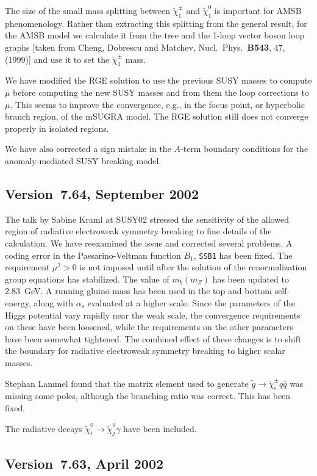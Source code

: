 The size of the small mass splitting between $\tilde\chi_1^\pm$ and
$\tilde\chi_1^0$ is important for AMSB phenomenology. Rather than
extracting this splitting from the general result, for the AMSB model we
calculate it from the tree and the 1-loop vector boson loop graphs
[taken from Cheng, Dobrescu and Matchev, Nucl.\ Phys.\ {\bf B543}, 47,
(1999)] and use it to set the $\tilde\chi_1^\pm$ mass.

We have modified the RGE solution to use the previous SUSY masses to
compute $\mu$ before computing the new SUSY masses and from them the
loop corrections to $\mu$. This seems to improve the convergence, e.g.,
in the focus point, or hyperbolic branch region, of the mSUGRA model. 
The RGE solution still does not converge properly in isolated regions.

We have also corrected a sign mistake in the $A$-term boundary
conditions for the anomaly-mediated SUSY breaking model.

\subsection{Version~7.64, September 2002}

     The talk by Sabine Kraml at SUSY02 stressed the sensitivity of the
allowed region of radiative electroweak symmetry breaking to fine
details of the calculation. We have reexamined the issue and corrected
several problems. A coding error in the Passarino-Veltman function $B_1$,
\verb|SSB1| has been fixed. The requirement $\mu^2>0$ is not imposed
until after the solution of the renormalization group equations has
stabilized. The value of $m_b(m_Z)$ has been updated to 2.83~GeV. A
running gluino mass has been used in the top and bottom self-energy,
along with $\alpha_s$ evaluated at a higher scale. Since the parameters
of the Higgs potential vary rapidly near the weak scale, the convergence
requirements on these have been loosened, while the requirements on the
other parameters have been somewhat tightened. The combined effect of
these changes is to shift the boundary for radiative electroweak
symmetry breaking to higher scalar masses.

     Stephan Lammel found that the matrix element used to generate
$\tilde g \to \tilde\chi_i^\pm q \bar q$ was missing some poles,
although the branching ratio was correct. This has been fixed.

     The radiative decays $\tilde\chi_i^0 \to \tilde\chi_j^0 \gamma$ 
have been included.

\subsection{Version~7.63, April 2002}

